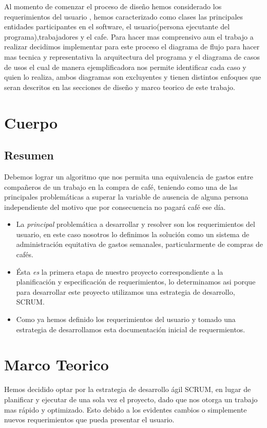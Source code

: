 \documentclass[twocolumn,11pts]{IEEEtran}
\begin{document}
Al momento de comenzar el proceso de diseño hemos considerado los requerimientos del usuario , hemos caracterizado como clases las principales entidades participantes en el software, el usuario(persona ejecutante del programa),trabajadores y el cafe.
Para hacer mas comprensivo aun el trabajo a realizar decidimos implementar para este proceso el diagrama de flujo para hacer mas tecnica y representativa la arquitectura del programa y el diagrama de casos de usos el cual de manera ejemplificadora nos permite identificar cada caso y quien lo realiza, ambos diagramas son excluyentes y tienen distintos enfoques que seran descritos en las secciones de diseño y marco teorico de este trabajo.

\section{Cuerpo}

\subsection{Resumen}

Debemos lograr un algoritmo que nos permita una equivalencia de gastos entre compañeros de un trabajo en la compra de café, teniendo como una de las principales problemáticas a superar la variable de ausencia de alguna persona independiente del motivo que por consecuencia no pagará café ese día.
\begin{itemize}
\item La \emph{principal} problemática a desarrollar y resolver son los requerimientos del usuario, en este caso nosotros lo definimos la solución como un sistema de administración equitativa de gastos semanales, particularmente de compras de cafés.
\item Ésta \emph{es} la primera etapa de nuestro proyecto correspondiente a la planificación y especificación de requerimientos, lo determinamos asi porque para desarrollar este proyecto utilizamos una estrategia de desarrollo, SCRUM.
\item Como ya hemos definido los requerimientos del usuario y tomado una estrategia de desarrollamos esta documentación inicial de requermientos.
\end{itemize}


\section{Marco Teorico}

Hemos decidido optar por la estrategia de desarrollo ágil SCRUM, en lugar de planificar y ejecutar de una sola vez el proyecto, dado que nos otorga un trabajo mas rápido y optimizado. Esto debido a los evidentes cambios o simplemente nuevos requerimientos que pueda presentar el usuario.
\end{document}
